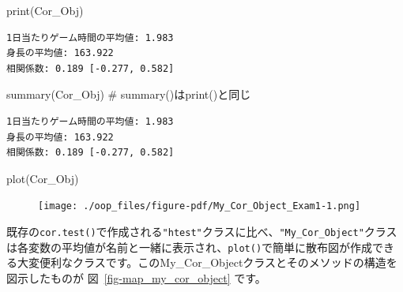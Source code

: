 \documentclass[
  a4paper,
  pandoc,
  ja=standard,
  jafont=haranoaji]{bxjsbook}
\newenvironment{Shaded}{\begin{snugshade}}{\end{snugshade}}
\newcommand{\CommentTok}[1]{\textcolor[rgb]{0.37,0.37,0.37}{#1}}
\newcommand{\FunctionTok}[1]{\textcolor[rgb]{0.28,0.35,0.67}{#1}}
\newcommand{\NormalTok}[1]{\textcolor[rgb]{0.00,0.48,0.65}{#1}}
\begin{document}
\begin{Shaded}
\begin{Highlighting}[numbers=left,,]
\FunctionTok{print}\NormalTok{(Cor\_Obj)}
\end{Highlighting}
\end{Shaded}

\begin{verbatim}
1日当たりゲーム時間の平均値: 1.983
身長の平均値: 163.922
相関係数: 0.189 [-0.277, 0.582]
\end{verbatim}

\begin{Shaded}
\begin{Highlighting}[numbers=left,,]
\FunctionTok{summary}\NormalTok{(Cor\_Obj) }\CommentTok{\# summary()はprint()と同じ}
\end{Highlighting}
\end{Shaded}

\begin{verbatim}
1日当たりゲーム時間の平均値: 1.983
身長の平均値: 163.922
相関係数: 0.189 [-0.277, 0.582]
\end{verbatim}

\begin{Shaded}
\begin{Highlighting}[numbers=left,,]
\FunctionTok{plot}\NormalTok{(Cor\_Obj)}
\end{Highlighting}
\end{Shaded}

\begin{figure}[H]

{\centering \texttt{[image: ./oop\_files/figure-pdf/My\_Cor\_Object\_Exam1-1.png]}

}

\end{figure}

既存の\texttt{cor.test()}で作成される\texttt{"htest"}クラスに比べ、\texttt{"My\_Cor\_Object"}クラスは各変数の平均値が名前と一緒に表示され、\texttt{plot()}で簡単に散布図が作成できる大変便利なクラスです。このMy\_Cor\_Objectクラスとそのメソッドの構造を図示したものが
図~\ref{fig-map_my_cor_object} です。
\end{document}
